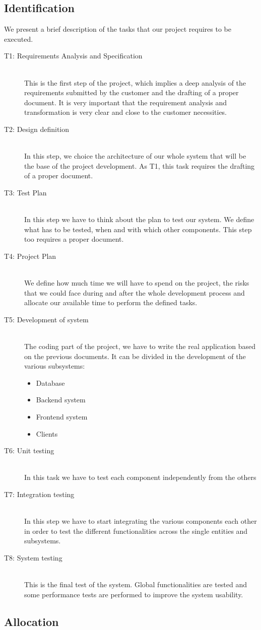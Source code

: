 	\subsection{Identification}
	We present a brief description of the tasks that our project requires to be executed.
	\begin{description}
		\item [T1: Requirements Analysis and Specification] \hfill \\
			This is the first step of the project, which implies a deep analysis of the requirements
			submitted by the customer and the drafting of a proper document. It is very important that
			the requirement analysis and transformation is very clear and close to the customer necessities.
		\item [T2: Design definition] \hfill \\
			In this step, we choice the architecture of our whole system that will be the base of the
			project development. As T1, this task requires the drafting of a proper document.
		\item [T3: Test Plan] \hfill \\
			In this step we have to think about the plan to test our system. We define what has to be tested,
			when and with which other components. This step too requires a proper document.
		\item [T4: Project Plan] \hfill \\
			We define how much time we will have to spend on the project, the risks that we could face during
			and after the whole development process and allocate our available time to perform the defined tasks.
		\item [T5: Development of system] \hfill \\
			The coding part of the project, we have to write the real application based on the previous documents.
			It can be divided in the development of the various subsystems:
			\begin{itemize}
				\item Database
				\item Backend system
				\item Frontend system
				\item Clients
			\end{itemize}
		\item [T6: Unit testing] \hfill \\
			In this task we have to test each component independently from the others
		\item [T7: Integration testing] \hfill \\
			In this step we have to start integrating the various components each other in order to test the
			different functionalities across the single entities and subsystems. 
		\item [T8: System testing] \hfill \\
			This is the final test of the system. Global functionalities are tested and some performance tests
			are performed to improve the system usability.
	\end{description}
	\subsection{Allocation}